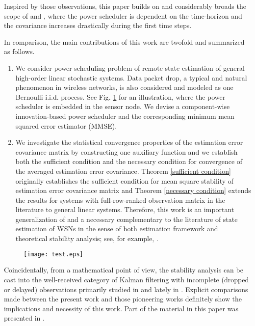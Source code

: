 \documentclass[journal]{IEEEtran}
\begin{document}
Inspired by those observations, this paper builds on and considerably broads the scope of \cite{tsp2012shixie} and \cite{tsp2012you}, where the power scheduler is dependent on the time-horizon  and the covariance increases drastically during the first  time steps. {\color{black}In comparison, the main contributions of this work are twofold and summarized as follows.
\begin{enumerate}
\item We consider power scheduling problem of remote state estimation of general high-order linear stochastic systems. Data packet drop, a typical and natural phenomenon in wireless networks, is also considered and modeled as one Bernoulli i.i.d. process. See Fig. \ref{fig1} for an illustration, where the power scheduler is embedded in the sensor node. We devise a component-wise innovation-based power scheduler and the corresponding minimum mean squared error estimator (MMSE).

\item We investigate the statistical convergence properties of the estimation error covariance matrix by constructing one auxiliary function and we establish both the sufficient condition and the necessary condition for convergence of the averaged estimation error covariance. Theorem \ref{sufficient condition} originally establishes the sufficient condition for mean square stability of estimation error covariance matrix and Theorem \ref{necessary condition} extends the results for systems with full-row-ranked observation matrix in the literature to general linear systems.  Therefore, this work is an important generalization of and a necessary complementary to the literature of state estimation of WSNs in the sense of both estimation framework and theoretical stability analysis; see, for example, \cite{tsp2012you, tsp2006ribeiro, cs2010ribeiro, tac2004sinopoli, cdc2007garone, auto2011youxie}.

\end{enumerate}

\begin{figure}
\begin{minipage}[b]{0.5\textwidth}
\centering
\texttt{[image: test.eps]}
{}
\label{fig1}
\end{minipage}\end{figure}
}

Coincidentally, from a mathematical point of view, the stability analysis can be cast into the well-received category of Kalman filtering with incomplete (dropped or delayed) observations primarily studied in \cite{tac2004sinopoli, cdc2004goldsmith, cdc2007garone, tac2008luca, auto2009shixie} and lately in \cite{tac2012sinopoli, arxiv2009sinopoli}. Explicit comparisons made between the present work and those pioneering works definitely show the implications and necessity of this work. Part of the material in this paper was presented in \cite{cyber2013wang}.
\end{document}
